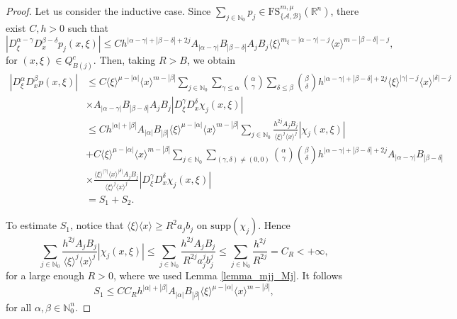 \documentclass[11pt,reqno]{amsart}
\numberwithin{equation}{section}
\newcommand{\R}{{\mathbb{R}}} %
\newcommand{\N}{{\mathbb{N}}} %
\newcommand{\FS}{{\mathrm{FS}}}
\newcommand{\A}{{\mathcal{A}}} %
\newcommand{\B}{{\mathcal{B}}} %
\begin{document}
\begin{proof}
	Let us consider the inductive case. Since $\sum_{j\in\N_0} p_j \in \FS_{\{\A,\B\}}^{m,\mu}(\R^n)$, there exist $C,h>0$ such that
	\begin{equation}
		|D_\xi^{\alpha-\gamma}D_x^{\beta-\delta}p_j(x,\xi)| \leq Ch^{|\alpha-\gamma|+|\beta-\delta|+2j}A_{|\alpha-\gamma|}B_{|\beta-\delta|}A_jB_j\langle\xi\rangle^{m_\xi-|\alpha-\gamma|-j}\langle x\rangle^{m-|\beta-\delta|-j},
	\end{equation}
	for $(x,\xi)\in Q_{B(j)}^c$. Then, taking $R>B$, we obtain
	\begin{align*}
		|D_\xi^\alpha D_x^\beta p(x,\xi)| & \leq  C\langle\xi\rangle^{\mu-|\alpha|}\langle x\rangle^{m-|\beta|}\sum_{j\in\N_0}\sum_{\gamma\leq\alpha}\binom{\alpha}{\gamma} \sum_{\delta\leq\beta}\binom{\beta}{\delta} h^{|\alpha-\gamma|+|\beta-\delta|+2j}\langle\xi\rangle^{|\gamma|-j}\langle x\rangle^{|\delta|-j}\\
		& \times A_{|\alpha-\gamma|}B_{|\beta-\delta|}A_jB_j |D_\xi^\gamma D_x^\delta\chi_j(x,\xi)|\\
		& \leq Ch^{|\alpha|+|\beta|} A_{|\alpha|}B_{|\beta|} \langle\xi\rangle^{\mu-|\alpha|}\langle x\rangle^{m-|\beta|}  \sum_{j\in\N_0} \frac{h^{2j}A_jB_j}{\langle\xi\rangle^{j}\langle x\rangle^{j}}|\chi_j(x,\xi)|\\
		& + C \langle\xi\rangle^{\mu-|\alpha|}\langle x\rangle^{m-|\beta|}\sum_{j\in\N_0}\sum_{(\gamma,\delta)\neq(0,0)}\binom{\alpha}{\gamma}\binom{\beta}{\delta}h^{|\alpha-\gamma|+|\beta-\delta|+2j}A_{|\alpha-\gamma|}B_{|\beta-\delta|}\\
		& \times \frac{\langle\xi\rangle^{|\gamma|}\langle x\rangle^{|\delta|} A_jB_j}{\langle\xi\rangle^j\langle x\rangle^j}|D_\xi^\gamma D_x^\delta\chi_j(x,\xi)|\\
		& = S_1 + S_2.
	\end{align*}
	
	To estimate $S_1$, notice that $\langle\xi\rangle\langle x\rangle \geq R^2a_jb_j$ on $\mathrm{supp}(\chi_j)$. Hence
	\begin{equation*}
		\sum_{j\in\N_0} \frac{h^{2j}A_jB_j}{\langle\xi\rangle^{j}\langle x\rangle^{j}}|\chi_j(x,\xi)| \leq \sum_{j\in\N_0} \frac{h^{2j}A_jB_j}{R^{2j}a_j^jb_j^j} \leq \sum_{j\in\N_0}\frac{h^{2j}}{R^{2j}} = C_{R} < +\infty,
	\end{equation*}
	for a large enough $R>0$, where we used Lemma \ref{lemma_mjj_Mj}. It follows
	\[S_1 \leq CC_Rh^{|\alpha|+|\beta|}A_{|\alpha|}B_{|\beta|}\langle\xi\rangle^{\mu-|\alpha|}\langle x\rangle^{m-|\beta|},\]
	for all $\alpha,\beta\in\N_0^n$.
	

\end{proof}
\end{document}
